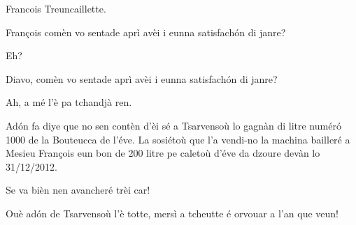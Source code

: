 \begin{drama}
\Francoisspeaks{} Francois Treuncaillette.

\Journalistespeaks François comèn vo sentade aprì avèi i eunna satisfach\'on di janre?

\Francoisspeaks Eh?

\Journalistespeaks Diavo, comèn vo sentade aprì avèi i eunna satisfach\'on di janre?

\Francoisspeaks Ah, a mé l’è pa tchandjà ren.


\Seunteuccospeaks Ad\'on fa diye que no sen contèn d'èi sé a Tsarvensoù lo gagnàn di litre num\'er\'o 1000 de la Bouteucca de l'éve. La sosiétoù que l’a vendi-no la machina bailleré a Mesieu François eun bon de 200 litre pe caletoù d'éve da dzoure devàn lo 31/12/2012.


\Prosperospeaks Se va bièn nen avancheré trèi car!\riye

\Journalistespeaks Ouè ad\'on de Tsarvensoù l'è totte, mersì a tcheutte é orvouar a l'an que veun!

\ridocliou

\DeriLeRido
{}

\end{drama}



